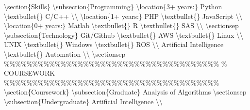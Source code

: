 \documentclass{article}%
\begin{document}
\newline%
\textbackslash{}section\{Skills\}\newline%
\textbackslash{}subsection\{Programming\}\newline%
\textbackslash{}location\{3+ years:\}\newline%
Python \textbackslash{}textbullet\{\} C/C++ \textbackslash{}\textbackslash{}\newline%
\textbackslash{}location\{1+ years:\}\newline%
PHP \textbackslash{}textbullet\{\} JavaScript \textbackslash{}\textbackslash{}\newline%
\textbackslash{}location\{0+ years:\}\newline%
Matlab \textbackslash{}textbullet\{\} R \textbackslash{}textbullet\{\} SAS \textbackslash{}\textbackslash{}\newline%
\textbackslash{}sectionsep\newline%
\newline%
\textbackslash{}subsection\{Technology\}\newline%
Git/Github \textbackslash{}textbullet\{\} AWS \textbackslash{}textbullet\{\} Linux \textbackslash{}\textbackslash{}\newline%
UNIX \textbackslash{}textbullet\{\} Windows \textbackslash{}textbullet\{\} ROS \textbackslash{}\textbackslash{}\newline%
Artificial Intelligence \textbackslash{}textbullet\{\} Automation \textbackslash{}\textbackslash{}\newline%
\textbackslash{}sectionsep\newline%
\newline%
\%\%\%\%\%\%\%\%\%\%\%\%\%\%\%\%\%\%\%\%\%\%\%\%\%\%\%\%\%\%\%\%\%\%\%\%\%\%\newline%
\%     COURSEWORK\newline%
\%\%\%\%\%\%\%\%\%\%\%\%\%\%\%\%\%\%\%\%\%\%\%\%\%\%\%\%\%\%\%\%\%\%\%\%\%\%\newline%
\newline%
\textbackslash{}section\{Coursework\}\newline%
\textbackslash{}subsection\{Graduate\}\newline%
Analysis of Algorithms\newline%
\textbackslash{}sectionsep\newline%
\newline%
\textbackslash{}subsection\{Undergraduate\}\newline%
Artificial Intelligence \textbackslash{}\textbackslash{}\newline%
\end{document}
